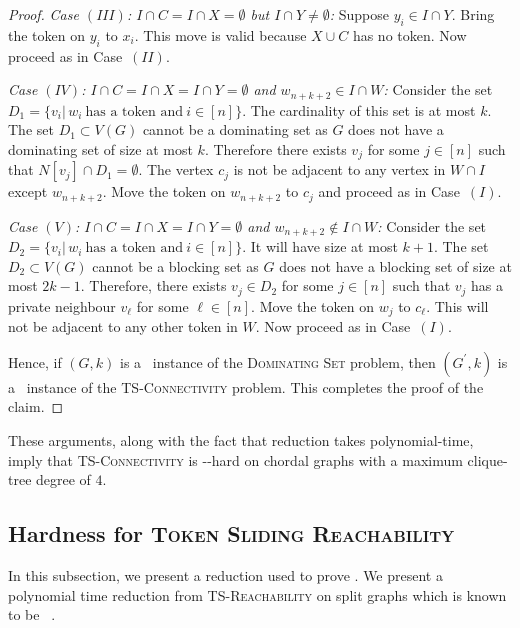 \begin{proof}
\emph{Case $(III)$: $I\cap C=I\cap X=\emptyset$ but $I\cap Y\neq \emptyset$:} 
Suppose $y_i\in I \cap Y$. Bring the token on $y_i$ to $x_i$. This move is valid because $X\cup C$ has no token. Now proceed as in Case~$(II)$.

\emph{Case $(IV)$: $I\cap C=I\cap X=I\cap Y=\emptyset$ and $w_{n+k+2}\in I\cap W$:}
Consider the set $D_1=\{v_i| \,w_i~\text{has a token and}~ i\in [n]\}$.
The cardinality of this set is at most $k$.
The set $D_1\subset V(G)$ cannot be a dominating set as $G$ does not have a dominating set of size at most $k$. 
Therefore there exists $v_j$ for some $j\in [n]$ such that ${N[v_j]\cap D_1}=\emptyset$. 
The vertex $c_j$ is not be adjacent to any vertex in $W\cap I$ 
except $w_{n+k+2}$. 
Move the token on $w_{n+k+2}$ to $c_j$ and proceed as in Case~$(I)$.

\emph{Case $(V)$: $I\cap C=I\cap X=I\cap Y=\emptyset$ and $w_{n+k+2}\notin I\cap W$:} 
Consider the set $D_2=\{v_i| \,w_i~\text{has a token and}~i\in [n]\}$. 
It will have size at most $k+1$. 
The set $D_2 \subset V(G)$ cannot be a blocking set as 
$G$ does not have a blocking set of size at most $2k-1$. 
Therefore, there exists $v_j\in D_2$ for some $j\in [n]$ 
such that $v_j$ has a private neighbour $v_\ell$ for some $\ell\in[n]$. 
Move the token on $w_j$ to $c_\ell$. 
This will not be adjacent to any other token in $W$. 
Now proceed as in Case~$(I)$.

Hence, if $(G,k)$ is a \no\ instance of the \textsc{Dominating Set} problem, then $(G^\prime,k)$ is a \yes\ instance of the \textsc{TS-Connectivity} problem.
This completes the proof of the claim.
\end{proof}

These arguments, along with the fact that reduction 
takes polynomial-time, imply that \textsc{TS-Connectivity} is {\co-\NP-hard} on chordal graphs with a maximum clique-tree degree of $4$.



\subsection{Hardness for \textsc{Token Sliding Reachability}}
In this subsection, we present a reduction used to prove .
We present a polynomial time reduction from
\textsc{TS-Reachability} on split graphs
which is known to be \NPH~\cite{DBLP:journals/mst/BelmonteKLMOS21}.


